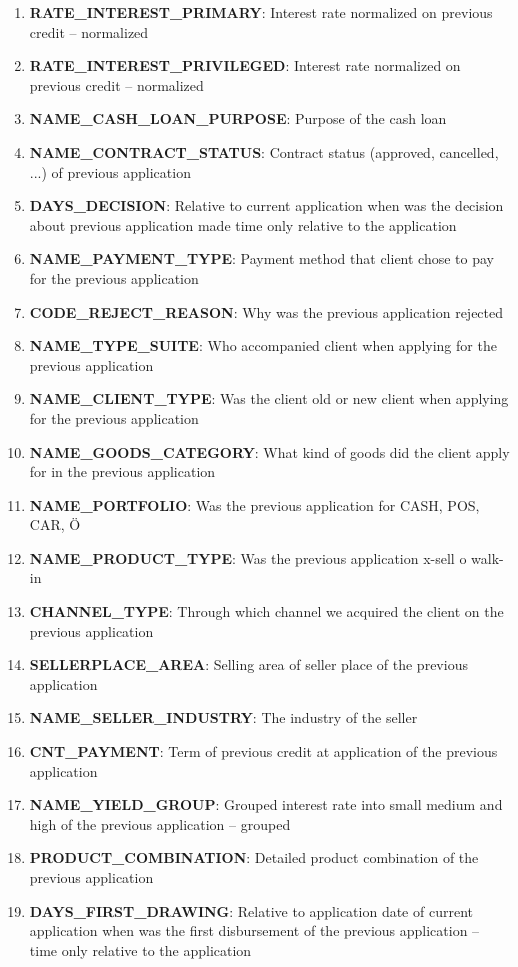 \documentclass[12pt, letterpaper]{article}
\begin{document}
\begin{appendices}
\begin{enumerate}
  \item \textbf{RATE_INTEREST_PRIMARY}: Interest rate normalized on previous credit -- normalized
  \item \textbf{RATE_INTEREST_PRIVILEGED}: Interest rate normalized on previous credit -- normalized
  \item \textbf{NAME_CASH_LOAN_PURPOSE}: Purpose of the cash loan
  \item \textbf{NAME_CONTRACT_STATUS}: Contract status (approved, cancelled, ...) of previous application
  \item \textbf{DAYS_DECISION}: Relative to current application when was the decision about previous application made	time only relative to the application
  \item \textbf{NAME_PAYMENT_TYPE}: Payment method that client chose to pay for the previous application
  \item \textbf{CODE_REJECT_REASON}: Why was the previous application rejected
  \item \textbf{NAME_TYPE_SUITE}: Who accompanied client when applying for the previous application
  \item \textbf{NAME_CLIENT_TYPE}: Was the client old or new client when applying for the previous application
  \item \textbf{NAME_GOODS_CATEGORY}: What kind of goods did the client apply for in the previous application
  \item \textbf{NAME_PORTFOLIO}: Was the previous application for CASH, POS, CAR, Ö
  \item \textbf{NAME_PRODUCT_TYPE}: Was the previous application x-sell o walk-in
  \item \textbf{CHANNEL_TYPE}: Through which channel we acquired the client on the previous application
  \item \textbf{SELLERPLACE_AREA}: Selling area of seller place of the previous application
  \item \textbf{NAME_SELLER_INDUSTRY}: The industry of the seller
  \item \textbf{CNT_PAYMENT}: Term of previous credit at application of the previous application
  \item \textbf{NAME_YIELD_GROUP}: Grouped interest rate into small medium and high of the previous application -- grouped
  \item \textbf{PRODUCT_COMBINATION}: Detailed product combination of the previous application
  \item \textbf{DAYS_FIRST_DRAWING}: Relative to application date of current application when was the first disbursement of the previous application -- time only relative to the application

\end{enumerate}
\end{appendices}
\end{document}
